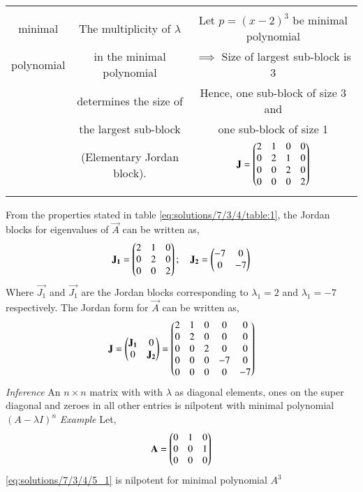 \begin{table*}[!ht]
\begin{center}
\begin{tabular}{|c|c|c|}
& &\\
minimal & The multiplicity of $\lambda$ & Let $p = (x-2)^3$ be minimal polynomial\\
polynomial & in the minimal polynomial& $\implies$ Size of largest sub-block is 3\\
& determines the size of & Hence, one sub-block of size 3 and\\
& the largest sub-block & one sub-block of size 1\\
& (Elementary Jordan block).& $\mathbf{J} = \begin{pmatrix}2 & 1 & 0 & 0 \\ 0 & 2 & 1 & 0 \\ 0 & 0 & 2 & 0 \\ 0 & 0 & 0 & 2\end{pmatrix}$\\
& &\\
\hline
\end{tabular}
\caption{Properties of Jordan blocks and Jordan canonical form}
\label{eq:solutions/7/3/4/table:1}
\end{center}
\end{table*}

From the properties stated in table \ref{eq:solutions/7/3/4/table:1}, the Jordan blocks for eigenvalues of $\vec{A}$ can be written as,
\begin{align}
    \mathbf{J_1} = \begin{pmatrix}2 & 1 & 0 \\ 0 & 2 & 0 \\ 0 & 0 & 2\end{pmatrix}; \quad 
    \mathbf{J_2} = \begin{pmatrix}-7 & 0 \\ 0 & -7\end{pmatrix} \label{eq:solutions/7/3/4/eq:3_1}
\end{align}
Where $\vec{J_1}$ and $\vec{J_1}$ are the Jordan blocks corresponding to $\lambda_1 = 2$ and $\lambda_1 = -7$ respectively. The Jordan form for $\vec{A}$ can be written as,
\begin{align}
    \mathbf{J} = \begin{pmatrix}\mathbf{J_1} & 0 \\ 0 & \mathbf{J_2}\end{pmatrix} = \begin{pmatrix}2 & 1 & 0 & 0 & 0 \\ 0 & 2 & 0 & 0 & 0 \\ 0 & 0 & 2 & 0 & 0 \\ 0 & 0 & 0 & -7 & 0 \\ 0 & 0 & 0 & 0 & -7\end{pmatrix} 
\end{align}
{\em Inference}
An $n\times n$ matrix with with $\lambda$ as diagonal elements, ones on the super diagonal and zeroes in all other entries is nilpotent with minimal polynomial $(A-\lambda I)^n$
{\em Example}
Let,
\begin{align}
    \mathbf{A} = \begin{pmatrix}0 & 1 & 0 \\ 0 & 0 & 1 \\ 0 & 0 & 0\end{pmatrix} \label{eq:solutions/7/3/4/5_1}
\end{align}
\eqref{eq:solutions/7/3/4/5_1} is nilpotent for minimal polynomial $A^3$
%

